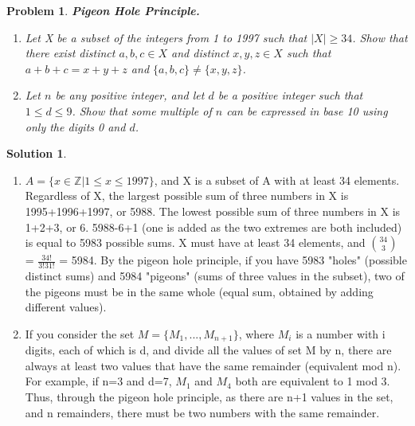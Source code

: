 \documentclass{article}
\newtheorem{problem}{Problem}
\theoremstyle{definition}
\newtheorem*{solution}{Solution}
\begin{document}
\begin{problem}\textbf{Pigeon Hole Principle.}
\begin{enumerate}[label = \alph*)]
    \item Let X be a subset of the integers from 1 to 1997 such that $|X|\ge 34$. Show that there exist distinct $a, b, c \in X$ and distinct $x,y,z\in X$ such that $a+b+c=x+y+z$ and $\{ a,b,c \} \neq \{x,y,z\}$.
    
    \item Let $n$ be any positive integer, and let $d$ be a positive integer such that $1\le d \le 9$. Show that some multiple of $n$ can be expressed in base 10 using only the digits 0 and $d$.
\end{enumerate}
\end{problem}

\begin{solution}
\end{solution}
\begin{enumerate}[label = \alph*)]
    \item $A = \{x\in \mathbb{Z} | 1\le x \le 1997\}$, and X is a subset of A with at least 34 elements. Regardless of X, the largest possible sum of three numbers in X is 1995+1996+1997, or 5988. The lowest possible sum of three numbers in X is 1+2+3, or 6. 5988-6+1 (one is added as the two extremes are both included) is equal to 5983 possible sums. X must have at least 34 elements, and $\binom{34}{3}$ = $\frac{34!}{3!31!}$ = 5984. By the pigeon hole principle, if you have 5983 "holes" (possible distinct sums) and 5984 "pigeons" (sums of three values in the subset), two of the pigeons must be in the same whole (equal sum, obtained by adding different values).
    
    \item If you consider the set $M=\{M_1, ... , M_{n+1}\}$, where $M_i$ is a number with i digits, each of which is d, and divide all the values of set M by n, there are always at least two values that have the same remainder (equivalent mod n). For example, if n=3 and d=7, $M_1$ and $M_4$ both are equivalent to 1 mod 3. Thus, through the pigeon hole principle, as there are n+1 values in the set, and n remainders, there must be two numbers with the same remainder.
\end{enumerate}
\end{document}
